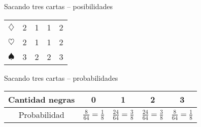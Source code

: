\documentclass[table]{beamer}
\begin{document}
\begin{frame}
\begin{block}{Sacando tres cartas -- posibilidades}
\begin{center}
\begin{tabular}{c|cccc}
                $\diamondsuit$ & 2 & 1 & 1 & 2 \\
                $\heartsuit$ & 2 & 1 & 1 & 2 \\
                $\spadesuit$ & 3 & 2 & 2 & 3
            \end{tabular}
        \end{center}
    \end{block}
    \begin{block}{Sacando tres cartas -- probabilidades}
        \begin{center}
            \begin{tabular}{c|c|c|c|c}
                Cantidad negras & 0 & 1 & 2 & 3 \\
                \hline
                Probabilidad & $\frac{8}{64} = \frac{1}{8}$ &
                $\frac{24}{64} = \frac{3}{8}$ &
                $\frac{24}{64} = \frac{3}{8}$ &
                $\frac{8}{64} = \frac{1}{8}$
            \end{tabular}
        \end{center}
    \end{block}
\end{frame}


\end{document}
